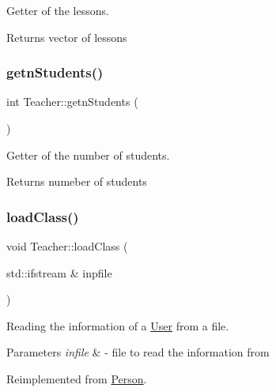 Getter of the lessons. 

\begin{DoxyReturn}{Returns}
vector of lessons 
\end{DoxyReturn}
\mbox{\label{class_teacher_ae2e2666d5c8eceb29d6650d7b15958b1}} 
\subsubsection{\texorpdfstring{getn\+Students()}{getnStudents()}}
{\footnotesize\ttfamily int Teacher\+::getn\+Students (\begin{DoxyParamCaption}{ }\end{DoxyParamCaption})}



Getter of the number of students. 

\begin{DoxyReturn}{Returns}
numeber of students 
\end{DoxyReturn}
\mbox{\label{class_teacher_a1f204644af41c43ff3bd0582393062fa}} 
\subsubsection{\texorpdfstring{load\+Class()}{loadClass()}}
{\footnotesize\ttfamily void Teacher\+::load\+Class (\begin{DoxyParamCaption}\item[{std\+::ifstream \&}]{inpfile }\end{DoxyParamCaption})\hspace{0.3cm}{\ttfamily [virtual]}}



Reading the information of a \mbox{\hyperlink{class_user}{User}} from a file. 


\begin{DoxyParams}{Parameters}
{\em infile} & -\/ file to read the information from \\
\hline
\end{DoxyParams}


Reimplemented from \mbox{\hyperlink{class_person_af07a032df8d56dddade4dc43960b536b}{Person}}.

\mbox{\label{class_teacher_aec95be6f77dc2b692627a6f4a5385971}} 
